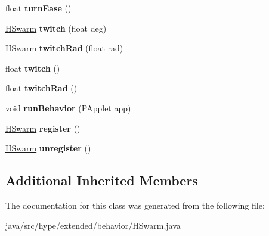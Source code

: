\begin{DoxyCompactItemize}
\item 
\hypertarget{classhype_1_1extended_1_1behavior_1_1_h_swarm_af6c307abf13baa55e1d7626c80c698eb}{float {\bfseries turn\-Ease} ()}\label{classhype_1_1extended_1_1behavior_1_1_h_swarm_af6c307abf13baa55e1d7626c80c698eb}

\item 
\hypertarget{classhype_1_1extended_1_1behavior_1_1_h_swarm_ae3bc87ddc605c7c3440e69eb5ab9463a}{\hyperlink{classhype_1_1extended_1_1behavior_1_1_h_swarm}{H\-Swarm} {\bfseries twitch} (float deg)}\label{classhype_1_1extended_1_1behavior_1_1_h_swarm_ae3bc87ddc605c7c3440e69eb5ab9463a}

\item 
\hypertarget{classhype_1_1extended_1_1behavior_1_1_h_swarm_afa83032889076f6c682fec0001a0bc5b}{\hyperlink{classhype_1_1extended_1_1behavior_1_1_h_swarm}{H\-Swarm} {\bfseries twitch\-Rad} (float rad)}\label{classhype_1_1extended_1_1behavior_1_1_h_swarm_afa83032889076f6c682fec0001a0bc5b}

\item 
\hypertarget{classhype_1_1extended_1_1behavior_1_1_h_swarm_a32c3135608f4a800e9b8642f947ba294}{float {\bfseries twitch} ()}\label{classhype_1_1extended_1_1behavior_1_1_h_swarm_a32c3135608f4a800e9b8642f947ba294}

\item 
\hypertarget{classhype_1_1extended_1_1behavior_1_1_h_swarm_ad85f4b4d8527a574f14de59242fe4987}{float {\bfseries twitch\-Rad} ()}\label{classhype_1_1extended_1_1behavior_1_1_h_swarm_ad85f4b4d8527a574f14de59242fe4987}

\item 
\hypertarget{classhype_1_1extended_1_1behavior_1_1_h_swarm_a99153bc44ab665ede78f956b91d83055}{void {\bfseries run\-Behavior} (P\-Applet app)}\label{classhype_1_1extended_1_1behavior_1_1_h_swarm_a99153bc44ab665ede78f956b91d83055}

\item 
\hypertarget{classhype_1_1extended_1_1behavior_1_1_h_swarm_a19465ded7588bcfc8223cb1de76d90dc}{\hyperlink{classhype_1_1extended_1_1behavior_1_1_h_swarm}{H\-Swarm} {\bfseries register} ()}\label{classhype_1_1extended_1_1behavior_1_1_h_swarm_a19465ded7588bcfc8223cb1de76d90dc}

\item 
\hypertarget{classhype_1_1extended_1_1behavior_1_1_h_swarm_ac4c534c88d5f2d9a798dda816bd4fca2}{\hyperlink{classhype_1_1extended_1_1behavior_1_1_h_swarm}{H\-Swarm} {\bfseries unregister} ()}\label{classhype_1_1extended_1_1behavior_1_1_h_swarm_ac4c534c88d5f2d9a798dda816bd4fca2}

\end{DoxyCompactItemize}
\subsection*{Additional Inherited Members}


The documentation for this class was generated from the following file\-:\begin{DoxyCompactItemize}
\item 
java/src/hype/extended/behavior/H\-Swarm.\-java\end{DoxyCompactItemize}
